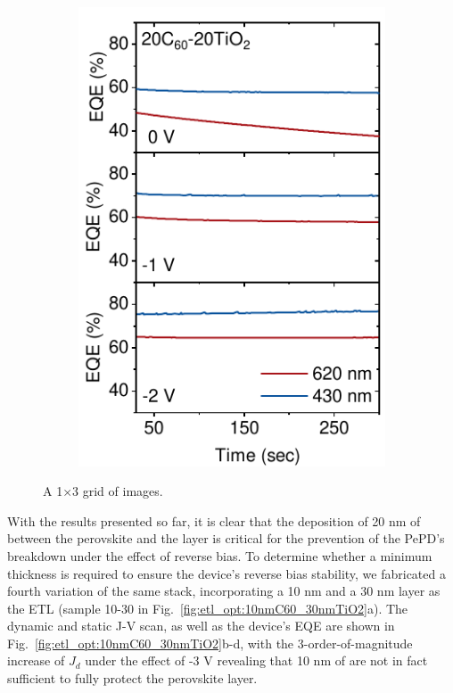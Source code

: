 \begin{figure}[htbp]
\begin{subfigure}{0.32\textwidth}
        \includegraphics[width=\textwidth]{chapters/transport_layers/images/StaticEQE_20_20.pdf}
        \caption{}
        \label{}
    \end{subfigure}
    
    \caption{A 1×3 grid of images.}
    \label{fig:etl_opt:static_eqe}
\end{figure}

With the results presented so far, it is clear that the deposition of 20 nm of  between the perovskite and the  layer is critical for the prevention of the PePD's breakdown under the effect of reverse bias. To determine whether a minimum  thickness is required to ensure the device's reverse bias stability, we fabricated a fourth variation of the same stack, incorporating a 10 nm  and a 30 nm  layer as the ETL (sample 10-30 in Fig.~\ref{fig:etl_opt:10nmC60_30nmTiO2}a). The dynamic and static J-V scan, as well as the device's EQE are shown in Fig.~\ref{fig:etl_opt:10nmC60_30nmTiO2}b-d, with the 3-order-of-magnitude increase of $J_d$ under the effect of -3 V revealing that 10 nm of  are not in fact sufficient to fully protect the perovskite layer.


